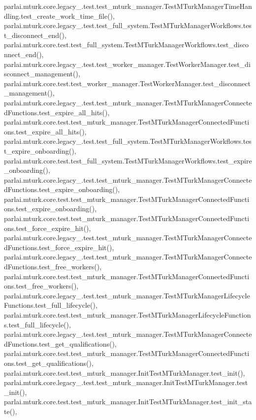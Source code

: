 parlai.\+mturk.\+core.\+legacy\+\_.\+test.\+test\+\_\+mturk\+\_\+manager.\+Test\+M\+Turk\+Manager\+Time\+Handling.\+test\+\_\+create\+\_\+work\+\_\+time\+\_\+file(), parlai.\+mturk.\+core.\+legacy\+\_.\+test.\+test\+\_\+full\+\_\+system.\+Test\+M\+Turk\+Manager\+Workflows.\+test\+\_\+disconnect\+\_\+end(), parlai.\+mturk.\+core.\+test.\+test\+\_\+full\+\_\+system.\+Test\+M\+Turk\+Manager\+Workflows.\+test\+\_\+disconnect\+\_\+end(), parlai.\+mturk.\+core.\+legacy\+\_.\+test.\+test\+\_\+worker\+\_\+manager.\+Test\+Worker\+Manager.\+test\+\_\+disconnect\+\_\+management(), parlai.\+mturk.\+core.\+test.\+test\+\_\+worker\+\_\+manager.\+Test\+Worker\+Manager.\+test\+\_\+disconnect\+\_\+management(), parlai.\+mturk.\+core.\+legacy\+\_.\+test.\+test\+\_\+mturk\+\_\+manager.\+Test\+M\+Turk\+Manager\+Connected\+Functions.\+test\+\_\+expire\+\_\+all\+\_\+hits(), parlai.\+mturk.\+core.\+test.\+test\+\_\+mturk\+\_\+manager.\+Test\+M\+Turk\+Manager\+Connected\+Functions.\+test\+\_\+expire\+\_\+all\+\_\+hits(), parlai.\+mturk.\+core.\+legacy\+\_.\+test.\+test\+\_\+full\+\_\+system.\+Test\+M\+Turk\+Manager\+Workflows.\+test\+\_\+expire\+\_\+onboarding(), parlai.\+mturk.\+core.\+test.\+test\+\_\+full\+\_\+system.\+Test\+M\+Turk\+Manager\+Workflows.\+test\+\_\+expire\+\_\+onboarding(), parlai.\+mturk.\+core.\+legacy\+\_.\+test.\+test\+\_\+mturk\+\_\+manager.\+Test\+M\+Turk\+Manager\+Connected\+Functions.\+test\+\_\+expire\+\_\+onboarding(), parlai.\+mturk.\+core.\+test.\+test\+\_\+mturk\+\_\+manager.\+Test\+M\+Turk\+Manager\+Connected\+Functions.\+test\+\_\+expire\+\_\+onboarding(), parlai.\+mturk.\+core.\+test.\+test\+\_\+mturk\+\_\+manager.\+Test\+M\+Turk\+Manager\+Connected\+Functions.\+test\+\_\+force\+\_\+expire\+\_\+hit(), parlai.\+mturk.\+core.\+legacy\+\_.\+test.\+test\+\_\+mturk\+\_\+manager.\+Test\+M\+Turk\+Manager\+Connected\+Functions.\+test\+\_\+force\+\_\+expire\+\_\+hit(), parlai.\+mturk.\+core.\+legacy\+\_.\+test.\+test\+\_\+mturk\+\_\+manager.\+Test\+M\+Turk\+Manager\+Connected\+Functions.\+test\+\_\+free\+\_\+workers(), parlai.\+mturk.\+core.\+test.\+test\+\_\+mturk\+\_\+manager.\+Test\+M\+Turk\+Manager\+Connected\+Functions.\+test\+\_\+free\+\_\+workers(), parlai.\+mturk.\+core.\+legacy\+\_.\+test.\+test\+\_\+mturk\+\_\+manager.\+Test\+M\+Turk\+Manager\+Lifecycle\+Functions.\+test\+\_\+full\+\_\+lifecycle(), parlai.\+mturk.\+core.\+test.\+test\+\_\+mturk\+\_\+manager.\+Test\+M\+Turk\+Manager\+Lifecycle\+Functions.\+test\+\_\+full\+\_\+lifecycle(), parlai.\+mturk.\+core.\+legacy\+\_.\+test.\+test\+\_\+mturk\+\_\+manager.\+Test\+M\+Turk\+Manager\+Connected\+Functions.\+test\+\_\+get\+\_\+qualifications(), parlai.\+mturk.\+core.\+test.\+test\+\_\+mturk\+\_\+manager.\+Test\+M\+Turk\+Manager\+Connected\+Functions.\+test\+\_\+get\+\_\+qualifications(), parlai.\+mturk.\+core.\+test.\+test\+\_\+mturk\+\_\+manager.\+Init\+Test\+M\+Turk\+Manager.\+test\+\_\+init(), parlai.\+mturk.\+core.\+legacy\+\_.\+test.\+test\+\_\+mturk\+\_\+manager.\+Init\+Test\+M\+Turk\+Manager.\+test\+\_\+init(), parlai.\+mturk.\+core.\+test.\+test\+\_\+mturk\+\_\+manager.\+Init\+Test\+M\+Turk\+Manager.\+test\+\_\+init\+\_\+state(), 